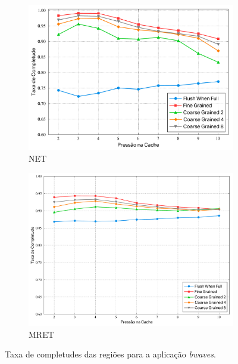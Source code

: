 \documentclass[12pt,twoside]{article}
\begin{document}
\begin{figure}[!ht]
        \centering
        \begin{subfigure}[b]{0.45\textwidth}
                \includegraphics[width=\textwidth]{./figs/net-bwaves-comp-ratio}
                \caption{NET}
                \label{fig-net-bwaves-comp-ratio}
        \end{subfigure}
        \quad %
                \begin{subfigure}[b]{0.45\textwidth}
                \includegraphics[width=\textwidth]{./figs/mret-bwaves-comp-ratio}
                \caption{MRET}
                \label{fig-mret-bwaves-comp-ratio}
        \end{subfigure}
\caption{Taxa de completudes das regiões para a aplicação \emph{bwaves}.}
\end{figure}
\end{document}
